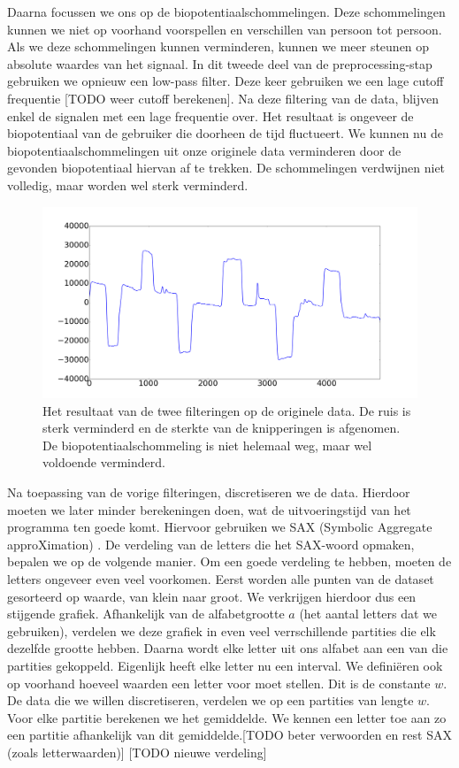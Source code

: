 \documentclass{article}
\begin{document}
Daarna focussen we ons op de biopotentiaalschommelingen. Deze schommelingen kunnen we niet op voorhand voorspellen en verschillen van persoon tot persoon. Als we deze schommelingen kunnen verminderen, kunnen we meer steunen op absolute waardes van het signaal. In dit tweede deel van de preprocessing-stap gebruiken we opnieuw een low-pass filter. Deze keer gebruiken we een lage cutoff frequentie [TODO weer cutoff berekenen]. Na deze filtering van de data, blijven enkel de signalen met een lage frequentie over. Het resultaat is ongeveer de biopotentiaal van de gebruiker die doorheen de tijd fluctueert. We kunnen nu de biopotentiaalschommelingen uit onze originele data verminderen door de gevonden biopotentiaal hiervan af te trekken. De schommelingen verdwijnen niet volledig, maar worden wel sterk verminderd.

\begin{figure}[h]
\centering
\includegraphics[width=\linewidth]{images/filtered_data}
\caption{Het resultaat van de twee filteringen op de originele data. De ruis is sterk verminderd en de sterkte van de knipperingen is afgenomen. De biopotentiaalschommeling is niet helemaal weg, maar wel voldoende verminderd.}
\end{figure}

Na toepassing van de vorige filteringen, discretiseren we de data. Hierdoor moeten we later minder berekeningen doen, wat de uitvoeringstijd van het programma ten goede komt. Hiervoor gebruiken we SAX (Symbolic Aggregate approXimation) \cite{sax}. De verdeling van de letters die het SAX-woord opmaken, bepalen we op de volgende manier. Om een goede verdeling te hebben, moeten de letters ongeveer even veel voorkomen. Eerst worden alle punten van de dataset gesorteerd op waarde, van klein naar groot. We verkrijgen hierdoor dus een stijgende grafiek. Afhankelijk van de alfabetgrootte $a$ (het aantal letters dat we gebruiken), verdelen we deze grafiek in even veel verrschillende partities die elk dezelfde grootte hebben. Daarna wordt elke letter uit ons alfabet aan een van die partities gekoppeld. Eigenlijk heeft elke letter nu een interval. We definiëren ook op voorhand hoeveel waarden een letter voor moet stellen. Dit is de constante $w$. De data die we willen discretiseren, verdelen we op een partities van lengte $w$. Voor elke partitie berekenen we het gemiddelde. We kennen een letter toe aan zo een partitie afhankelijk van dit gemiddelde.[TODO beter verwoorden en rest SAX (zoals letterwaarden)] [TODO nieuwe verdeling]
\end{document}
